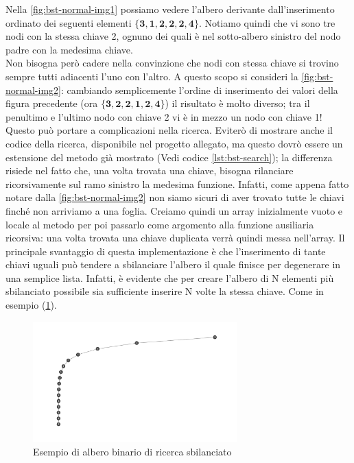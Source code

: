 \documentclass{article}
\begin{document}
Nella \cref{fig:bst-normal-img1} possiamo vedere l'albero derivante dall'inserimento ordinato dei seguenti elementi \(\mathbf{\{3, 1, 2, 2, 2, 4\}}\). Notiamo quindi che vi sono tre nodi con la stessa chiave 2, ognuno dei quali è nel sotto-albero sinistro del nodo padre con la medesima chiave.
\\
Non bisogna però cadere nella convinzione che nodi con stessa chiave si trovino sempre tutti adiacenti l'uno con l'altro.
A questo scopo si consideri la \cref{fig:bst-normal-img2}:  cambiando semplicemente l'ordine di inserimento dei valori della figura precedente (ora \(\mathbf{\{3, 2, 2, 1, 2, 4\}}\)) il risultato è molto diverso; tra il penultimo e l'ultimo nodo con chiave 2 vi è in mezzo un nodo con chiave 1!
Questo può portare a complicazioni nella ricerca.
Eviterò di mostrare anche il codice della ricerca, disponibile nel progetto allegato, ma questo dovrò essere un estensione del metodo già mostrato (Vedi codice \ref{lst:bst-search}); la differenza risiede nel fatto che, una volta trovata una chiave, bisogna rilanciare ricorsivamente sul ramo sinistro la medesima funzione. Infatti, come appena fatto notare dalla \cref{fig:bst-normal-img2} non siamo sicuri di aver trovato tutte le chiavi finché non arriviamo a una foglia. Creiamo quindi un array inizialmente vuoto e locale al metodo per poi passarlo come argomento alla funzione ausiliaria ricorsiva: una volta trovata una chiave duplicata verrà quindi messa nell'array. 
Il principale svantaggio di questa implementazione è che l'inserimento di tante chiavi uguali può tendere a sbilanciare l'albero il quale finisce per degenerare in una semplice lista. Infatti, è evidente che per creare l'albero di N elementi più sbilanciato possibile sia sufficiente inserire N volte la stessa chiave. Come in esempio (\cref{fig:bst-normal-img3}).


\begin{figure}[H]
  \centering
  \includegraphics[width=0.7\textwidth]{./images/bst-normal-img3}
  \caption{Esempio di albero binario di ricerca sbilanciato}
  \label{fig:bst-normal-img3}
\end{figure}
\end{document}
